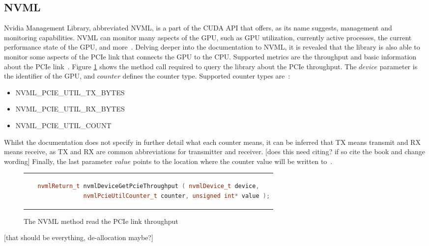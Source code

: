  
 \subsection{NVML}
 
 Nvidia Management Library, abbreviated NVML, is a part of the CUDA API that offers, as its name suggests, management and monitoring capabilities. NVML can monitor many aspects of the GPU, such as GPU utilization, currently active processes, the current performance state of the GPU, and more~\cite{nvidia_nvidia_2011}. Delving deeper into the documentation to NVML, it is revealed that the library is also able to monitor some aspects of the PCIe link that connects the GPU to the CPU. Supported metrics are the throughput and basic information about the PCIe link~\cite{nvidia_device_2021}. Figure \ref{fig:nvmlpcie} shows the method call required to query the library about the PCIe throughput. The $device$ parameter is the identifier of the GPU, and $counter$ defines the counter type. Supported counter types are~\cite{nvidia_device_2021}: 
 \begin{itemize}
 	\item NVML\_PCIE\_UTIL\_TX\_BYTES
 	\item NVML\_PCIE\_UTIL\_RX\_BYTES
 	\item NVML\_PCIE\_UTIL\_COUNT
 \end{itemize}
Whilst the documentation does not specify in further detail what each counter means, it can be inferred that TX means transmit and RX means receive, as TX and RX are common abbreviations for transmitter and receiver. [does this need citing? if so cite the book and change wording] Finally, the last parameter $value$ points to the location where the counter value will be written to~\cite{nvidia_device_2021}.

   \begin{figure}[htpb]
 	\centering
 	\begin{tabular}{c}
 		\begin{lstlisting}[language=C++]
 			nvmlReturn_t nvmlDeviceGetPcieThroughput ( nvmlDevice_t device,
 				nvmlPcieUtilCounter_t counter, unsigned int* value );
 		\end{lstlisting}
 	\end{tabular}
 	\caption[NVML counter readout]{The NVML method read the PCIe link throughput~\cite{nvidia_cuda_2022-1}}
 	\label{fig:nvmlpcie}
 \end{figure}
 
 [that should be everything, de-allocation maybe?]


